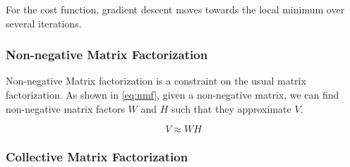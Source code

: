 For the cost function, gradient descent moves towards the local minimum over several iterations.


\subsubsection{Non-negative Matrix Factorization}

Non-negative Matrix factorization is a constraint on the usual matrix factorization. As shown in \ref{eq:nmf}, given a non-negative matrix, we can find non-negative matrix factors $W$ and $H$ such that they approximate $V$.

\begin{equation} \label{eq:nmf}
	V \approx W H
\end{equation}


\subsubsection{Collective Matrix Factorization}
